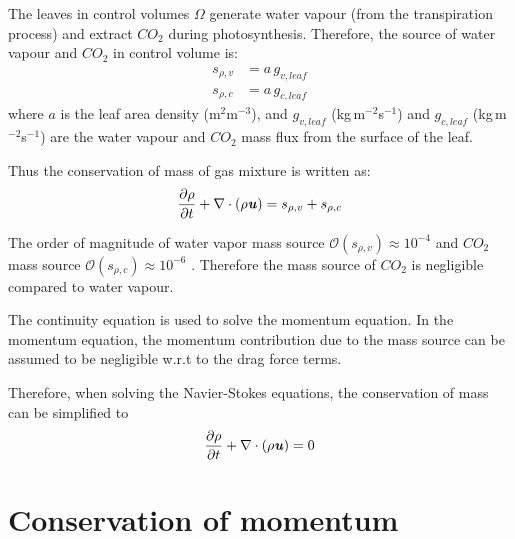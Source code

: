 The leaves in control volumes $\Omega$ generate water vapour (from the transpiration process) and extract $CO_2$ during photosynthesis. Therefore, the source of water vapour and $CO_2$ in control volume is:
\begin{align}
{s_{\rho ,v}} &= a\, g_{v,leaf} \label{eq:gvsource}\\
{s_{\rho ,c}} &= a\, g_{c,leaf}
\end{align}
where $a$ is the leaf area density (m$^2$m$^{-3}$), and $g_{v,\mathit{leaf}}$ (kg\,m$^{-2}$s$^{-1}$) and $g_{c,\mathit{leaf}}$ (kg\,m$^{-2}$s$^{-1}$) are the water vapour and $CO_2$ mass flux from the surface of the leaf.

Thus the conservation of mass of gas mixture is written as:
\begin{equation}
\frac{{\partial {\rho}}}{{\partial t}} + \nabla  \cdot \left( {{\rho }{\textbf{\textit{u}}}} \right) = s_{\rho,v} + s_{\rho,c}
\end{equation}




\begin{assumption}
The order of magnitude of water vapor mass source $\mathcal{O}\left(s_{\rho,v}\right)\approx10^{-4}$ and $CO_2$ mass source $\mathcal{O}\left(s_{\rho,c}\right)\approx10^{-6}$ \citep{Hiraoka2005}. Therefore the mass source of $CO_2$ is negligible compared to water vapour.
\end{assumption}

\begin{assumption}
The continuity equation is used to solve the momentum equation. In the momentum equation, the momentum contribution due to the mass source can be assumed to be negligible w.r.t to the drag force terms.
\end{assumption}

Therefore, when solving the Navier-Stokes equations, the conservation of mass can be simplified to
\begin{equation}
\frac{{\partial {\rho}}}{{\partial t}} + \nabla  \cdot \left( {{\rho }{\textbf{\textit{u}}}}\right) = 0
\end{equation}

\section{Conservation of momentum}
\label{sec:conservationofmomentum}

